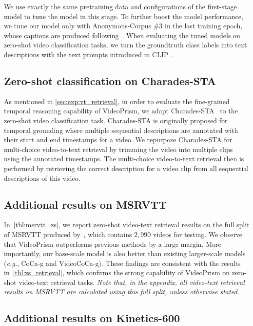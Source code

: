 \documentclass{article}
\theoremstyle{plain}
\theoremstyle{definition}
\theoremstyle{remark}
\newcommand{\OURS}{VideoPrism\xspace}
\newcommand{\eg}{\textit{e.g.}\xspace}
\begin{document}
We use exactly the same pretraining data and configurations of the first-stage model to tune the model in this stage. To further boost the model performance, we tune our model only with Anonymous-Corpus \#3 in the last training epoch, whose captions are produced following~\citet{zhao2024distilling}. When evaluating the tuned models on zero-shot video classification tasks, we turn the groundtruth class labels into text descriptions with the text prompts introduced in CLIP~\cite{radford2021learning}.

\subsection{Zero-shot classification on Charades-STA}\label{app:lit:charades_sta}

As mentioned in \cref{sec:exp:vt_retrieval}, in order to evaluate the fine-grained temporal reasoning capability of \OURS, we adapt Charades-STA~\cite{gao2017tall} to the zero-shot video classification task. Charades-STA is originally proposed for temporal grounding where multiple sequential descriptions are annotated with their start and end timestamps for a video.
We repurpose Charades-STA for multi-choice video-to-text retrieval by trimming the video into multiple clips using the annotated timestamps. 
The multi-choice video-to-text retrieval then is performed by retrieving the correct description for a video clip from all sequential descriptions of this video.

\subsection{Additional results on MSRVTT}\label{app:lit:msrvtt}

In~\cref{tbl:msrvtt_zs}, we report zero-shot video-text retrieval results on the full split of MSRVTT produced by~\citet{xu2016msr}, which contains $2,990$ videos for testing. We observe that \OURS outperforms previous methods by a large margin. More importantly, our base-scale model is also better than existing larger-scale models (\eg, CoCa-g and VideoCoCa-g). These findings are consistent with the results in~\cref{tbl:zs_retrieval}, which confirms the strong capability of \OURS on zero-shot video-text retrieval tasks. \emph{Note that, in the appendix, all video-text retrieval results on MSRVTT are calculated using this full split, unless otherwise stated.}

\subsection{Additional results on Kinetics-600}
\end{document}
